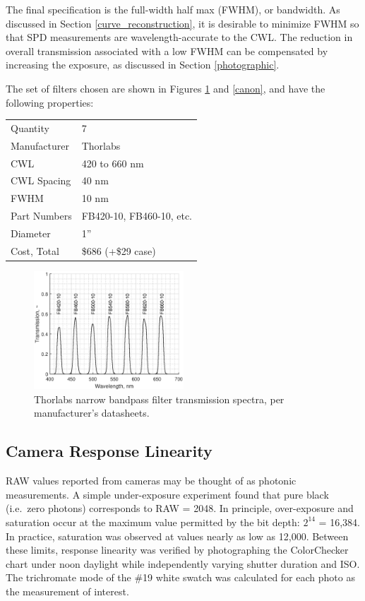 \documentclass[twocolumn,10pt]{asme2ej}
\newcommand{\id}{\hspace{6 mm}}
\begin{document}
\id The final specification is the full-width half max (FWHM), or bandwidth. As discussed in Section \ref{curve_reconstruction}, it is desirable to minimize FWHM so that SPD measurements are wavelength-accurate to the CWL. The reduction in overall transmission associated with a low FWHM can be compensated by increasing the exposure, as discussed in Section \ref{photographic}.

\id The set of filters chosen are shown in Figures \ref{thorlabs_filter_transmission_spectra} and \ref{canon}, and have the following properties:\\

\begin{tabular}{l | l}
Quantity & 7 \\
Manufacturer & Thorlabs \\
CWL & 420 to 660 nm \\
CWL Spacing & 40 nm \\
FWHM & 10 nm \\
Part Numbers & FB420-10, FB460-10, etc. \\
Diameter & 1'' \\
Cost, Total & \$686 (+\$29 case) \\
\end{tabular}

\begin{figure}
\centering
\includegraphics[width=0.5\textwidth]{thorlabs_filter_transmission_spectra.eps}
\caption{Thorlabs narrow bandpass filter transmission spectra, per manufacturer's datasheets. \cite{Thorlabs}}
\label{thorlabs_filter_transmission_spectra}
\end{figure}

\subsection{Camera Response Linearity}
\label{Camera Sensor Linearity}

RAW values reported from cameras may be thought of as photonic measurements. A simple under-exposure experiment found that pure black (i.e.\ zero photons) corresponds to RAW = 2048. In principle, over-exposure and saturation occur at the maximum value permitted by the bit depth: $2^{14}$ = 16,384. In practice, saturation was observed at values nearly as low as 12,000. Between these limits, response linearity was verified by photographing the ColorChecker chart under noon daylight while independently varying shutter duration and ISO. The trichromate mode of the \#19 white swatch was calculated for each photo as the measurement of interest.
\end{document}
